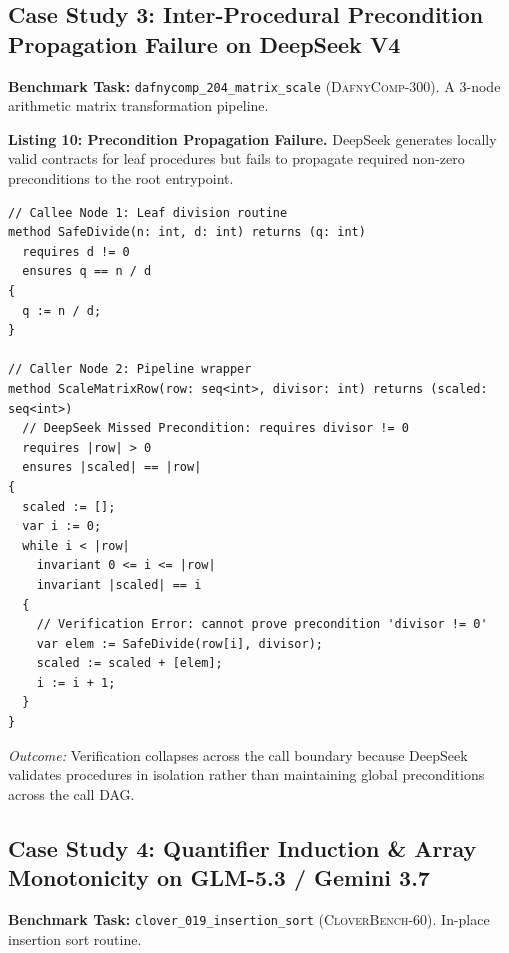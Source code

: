 \documentclass{article}
\begin{document}
\subsection{Case Study 3: Inter-Procedural Precondition Propagation Failure on DeepSeek V4}

\textbf{Benchmark Task:} \texttt{dafnycomp\_204\_matrix\_scale} (\textsc{DafnyComp-300}). A 3-node arithmetic matrix transformation pipeline.

\vspace{0.3em}
\noindent\textbf{Listing 10: Precondition Propagation Failure.} DeepSeek generates locally valid contracts for leaf procedures but fails to propagate required non-zero preconditions to the root entrypoint.
{\footnotesize
\begin{verbatim}
// Callee Node 1: Leaf division routine
method SafeDivide(n: int, d: int) returns (q: int)
  requires d != 0
  ensures q == n / d
{
  q := n / d;
}

// Caller Node 2: Pipeline wrapper
method ScaleMatrixRow(row: seq<int>, divisor: int) returns (scaled: seq<int>)
  // DeepSeek Missed Precondition: requires divisor != 0
  requires |row| > 0
  ensures |scaled| == |row|
{
  scaled := [];
  var i := 0;
  while i < |row|
    invariant 0 <= i <= |row|
    invariant |scaled| == i
  {
    // Verification Error: cannot prove precondition 'divisor != 0'
    var elem := SafeDivide(row[i], divisor);
    scaled := scaled + [elem];
    i := i + 1;
  }
}
\end{verbatim}
}
\textit{Outcome:} Verification collapses across the call boundary because DeepSeek validates procedures in isolation rather than maintaining global preconditions across the call DAG.

\subsection{Case Study 4: Quantifier Induction \& Array Monotonicity on GLM-5.3 / Gemini 3.7}

\textbf{Benchmark Task:} \texttt{clover\_019\_insertion\_sort} (\textsc{CloverBench-60}). In-place insertion sort routine.
\end{document}
